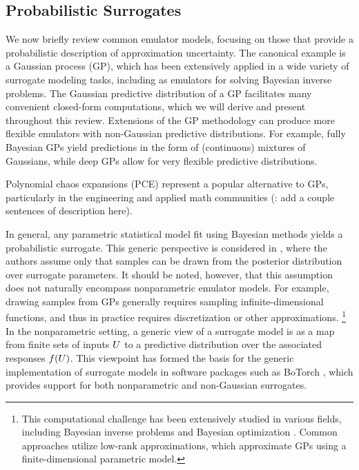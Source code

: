 \documentclass[12pt]{article}
\begin{document}
\subsection{Probabilistic Surrogates}
We now briefly review common emulator models, focusing on those that provide a probabilistic 
description of approximation uncertainty. The canonical example is a Gaussian process (GP),
which has been extensively applied in a wide variety of surrogate modeling tasks, including 
as emulators for solving Bayesian inverse problems. The Gaussian predictive distribution of a 
GP facilitates many convenient closed-form computations, which we will derive and present 
throughout this review. Extensions of the GP methodology can produce more flexible 
emulators with non-Gaussian predictive distributions. For example, fully Bayesian 
GPs yield predictions in the form of (continuous) mixtures of Gaussians, while deep GPs
\citep{deepGPVecchia,deepGPAL} allow for very flexible predictive distributions.

Polynomial chaos expansions (PCE) represent a popular alternative to GPs, particularly in
the engineering and applied math communities \citep{polyChaosReview,MarzoukPolyChaos}
(\todo: add a couple sentences of description here).

In general, any parametric statistical model fit using Bayesian methods yields a probabilistic
surrogate. This generic perspective is considered in \citep{BurknerSurrogate}, where the 
authors assume only that samples can be drawn from the posterior distribution over 
surrogate parameters. It should be noted, however, that this assumption does not naturally 
encompass nonparametric emulator models. For example, drawing samples from GPs 
generally requires sampling infinite-dimensional functions, and thus in practice requires 
discretization or other approximations.
\footnote{This computational challenge has been extensively studied in various fields, including
Bayesian inverse problems \citep{dimRedPolyChaos,functionSpaceMCMC} 
and Bayesian optimization \citep{pathwiseConditioning,samplingGPPosts}. 
Common approaches utilize low-rank approximations, which approximate GPs using a 
finite-dimensional parametric model.} In the nonparametric setting, a generic view of a 
surrogate model is as a map from finite sets of inputs $U$ to a predictive distribution 
over the associated responses $f(U)$. This viewpoint has formed the basis 
for the generic implementation of surrogate models in software packages such as 
BoTorch \citep{botorch}, which provides support for both nonparametric and non-Gaussian surrogates. 
\end{document}
